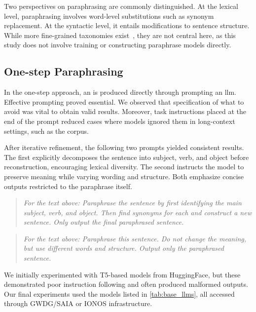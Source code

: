 Two perspectives on paraphrasing are commonly distinguished. 
At the lexical level, paraphrasing involves word-level substitutions such as synonym replacement. 
At the syntactic level, it entails modifications to sentence structure. 
While more fine-grained taxonomies exist~\citep{zhou_paraphrase_2025}, they are not central here, as this study does not involve training or constructing paraphrase models directly.


\subsection{One-step Paraphrasing}

In the one-step approach, an \imp{} is produced directly through prompting an \ac{llm}. 
Effective prompting proved essential.
We observed that specification of what to avoid was vital to obtain valid results. 
Moreover, task instructions placed at the end of the prompt reduced cases where models ignored them in long-context settings, such as the \dataGutenberg{} corpus.

After iterative refinement, the following two prompts yielded consistent results.
The first explicitly decomposes the sentence into subject, verb, and object before reconstruction, encouraging lexical diversity. 
The second instructs the model to preserve meaning while varying wording and structure. 
Both emphasize concise outputs restricted to the paraphrase itself.

\begin{quote}
    \textit{For the text above: Paraphrase the sentence by first identifying the main subject, verb, and object. Then find synonyms for each and construct a new sentence. Only output the final paraphrased sentence.}
\end{quote}

\begin{quote}
    \textit{For the text above: Paraphrase this sentence. Do not change the meaning, but use different words and structure. Output only the paraphrased sentence.}
\end{quote}

We initially experimented with T5-based models from HuggingFace, but these demonstrated poor instruction following and often produced malformed outputs. 
Our final experiments used the models listed in \autoref{tab:base_llms}, all accessed through GWDG/SAIA or IONOS infrastructure.

